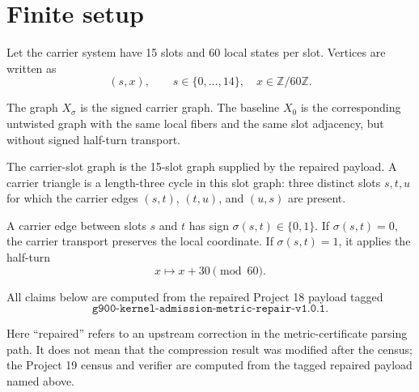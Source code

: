 \section{Finite setup}

Let the carrier system have 15 slots and 60 local states per slot. Vertices are written as
\[
    (s,x),
    \qquad
    s\in\{0,\dots,14\},\quad x\in\mathbb{Z}/60\mathbb{Z}.
\]

The graph \(X_\sigma\) is the signed carrier graph. The baseline \(X_0\) is the corresponding untwisted graph with the same local fibers and the same slot adjacency, but without signed half-turn transport.

The carrier-slot graph is the 15-slot graph supplied by the repaired payload. A carrier triangle is a length-three cycle in this slot graph: three distinct slots \(s,t,u\) for which the carrier edges \((s,t)\), \((t,u)\), and \((u,s)\) are present.

A carrier edge between slots \(s\) and \(t\) has sign \(\sigma(s,t)\in\{0,1\}\). If \(\sigma(s,t)=0\), the carrier transport preserves the local coordinate. If \(\sigma(s,t)=1\), it applies the half-turn
\[
    x \mapsto x+30 \pmod{60}.
\]

All claims below are computed from the repaired Project 18 payload tagged
\[
    \texttt{g900-kernel-admission-metric-repair-v1.0.1}.
\]

Here ``repaired'' refers to an upstream correction in the metric-certificate parsing path. It does not mean that the compression result was modified after the census; the Project 19 census and verifier are computed from the tagged repaired payload named above.

